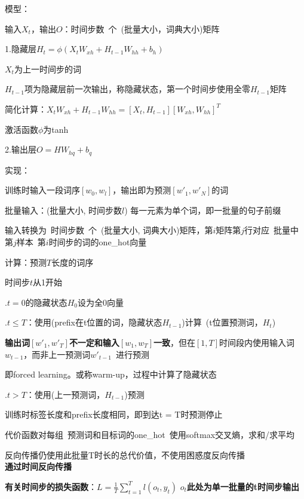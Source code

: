 \documentclass[UTF8]{ctexart}
\begin{document}
  模型：

  \quad 输入$X_t$，输出$O$：时间步数\ 个\ (批量大小，词典大小)矩阵

  \quad 1.隐藏层$H_t = \phi(X_tW_{xh} + H_{t-1}W_{hh} + b_h)$

  \quad \quad $X_t$为上一时间步的词

  \quad \quad $H_{t-1}$项为隐藏层前一次输出，称隐藏状态，第一个时间步使用全零$H_{t-1}$矩阵

  \quad \quad 简化计算：$X_tW_{xh} + H_{t-1}W_{hh} = [X_t, H_{t-1}][W_{xh}, W_{hh}]^T$

  \quad \quad 激活函数$\phi$为tanh

  \quad 2.输出层$O = HW_{hq} + b_q$
  
  实现：

  \quad 训练时输入一段词序$[w_{0}, w_{l}]$，输出即为预测$[w'_{1}, w'_N]$的词
  
  \quad 批量输入：(批量大小, 时间步数$l$) 每一元素为单个词，即一批量的句子前缀
  
  \quad \quad 输入转换为\ 时间步数\ 个\ (批量大小, 词典大小)矩阵，第$i$矩阵第$j$行对应\ 批量中第$j$样本\ 第$i$时间步的词的one\_hot向量
    
  \quad 计算：预测$T$长度的词序

  \quad \quad 时间步$t$从1开始

  \quad {}.$t = 0$的隐藏状态$H_0$设为全0向量

  \quad {}.$t \leq T$：使用(prefix在t位置的词，隐藏状态$H_{t-1}$)计算\ (t位置预测词，$H_t$)

  \quad \quad \quad \textbf{输出词$[w'_{1}, w'_{T}]$不一定和输入$[w_1, w_T]$一致}，但在$[1, T]$时间段内使用输入词$w_{t-1}$，而非上一预测词$w'_{t-1}$\ 进行预测

  \quad \quad \quad 即forced learning。或称warm-up，过程中计算了隐藏状态
  
  \quad {}.$t > T$：使用(上一预测词，$H_{t-1}$)预测

  \quad \quad \quad 训练时标签长度和prefix长度相同，即到达t = T时预测停止
  
  \quad \quad 代价函数对每组\ 预测词和目标词的one\_hot\ 使用softmax交叉熵，求和/求平均
  
  \quad \quad \quad 反向传播仍使用此批量T时长的总代价值，不使用困惑度反向传播\\
\textbf{通过时间反向传播}

  \textbf{有关时间步的损失函数}：$L = \frac{1}{T}\sum_{t = 1}^{T} l(o_t, y_t) $ \textbf{$o_t$此处为单一批量的t时间步输出}
\end{document}
